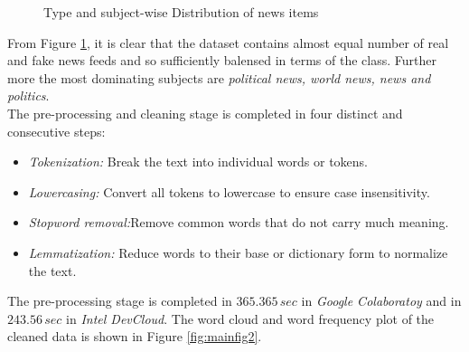 \documentclass{josis}
\begin{document}
\begin{figure}
    \caption{Type and subject-wise Distribution of news items}
    \label{fig:mainfig}
\end{figure}
From Figure \ref{fig:mainfig}, it is clear that the dataset contains almost equal number of real and fake news feeds and so sufficiently balensed in terms of the class. Further more the most dominating subjects are {\em political news, world news, news and politics}.\\
The pre-processing and cleaning stage is completed in four distinct and consecutive steps:
\begin{itemize}
    \item {\em Tokenization:} Break the text into individual words or tokens.
    \item {\em Lowercasing:} Convert all tokens to lowercase to ensure case insensitivity.
    \item {\em Stopword removal:}Remove common words that do not carry much meaning.
    \item {\em Lemmatization: } Reduce words to their base or dictionary form to normalize the text.
\end{itemize}
The pre-processing stage is completed in $365.365\,sec$ in {\em Google Colaboratoy} and in $243.56\,sec$ in {\em Intel DevCloud}.
The word cloud and word frequency plot of the cleaned data is shown in Figure \ref{fig:mainfig2}.
\end{document}
